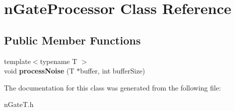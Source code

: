 \hypertarget{classnGateProcessor}{}\section{n\+Gate\+Processor Class Reference}
\label{classnGateProcessor}
\subsection*{Public Member Functions}
\begin{DoxyCompactItemize}
\item 
\mbox{\label{classnGateProcessor_a3cbd26f67a293af6364a57ef5160517e}} 
{\footnotesize template$<$typename T $>$ }\\void {\bfseries process\+Noise} (T $\ast$buffer, int buffer\+Size)
\end{DoxyCompactItemize}


The documentation for this class was generated from the following file\+:\begin{DoxyCompactItemize}
\item 
n\+Gate\+T.\+h\end{DoxyCompactItemize}
